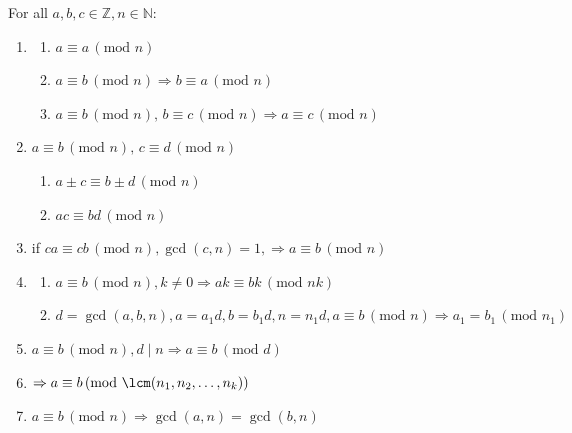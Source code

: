 \documentclass[../lecture-notes.tex]{subfiles}
\begin{document}
\begin{lemma} [Properties.] 
    For all $a, b, c \in \mathbb{Z}, n \in \mathbb{N}: $

    \begin{enumerate}
        \item 
        \begin{enumerate}
            \item $a \equiv a \, (\text{mod } n)$
            \item $a \equiv b \, (\text{mod } n) \Rightarrow b \equiv a \, (\text{mod } n)$
            \item $a \equiv b \, (\text{mod } n), \, b \equiv c \, (\text{mod } n) \Rightarrow a \equiv c \, (\text{mod } n)$
        \end{enumerate}
        \item $ a \equiv b \, (\text{mod } n), \, c \equiv d \, (\text{mod } n)$
        \begin{enumerate}
            \item $ a \pm c \equiv b \pm d \, (\text{mod } n)$
            \item $ ac \equiv bd \, (\text{mod } n)$
        \end{enumerate}
        \item if $ca \equiv cb \, (\text{mod } n), \gcd(c, n) = 1, \Rightarrow a \equiv b \, (\text{mod } n)$
        \item 
        \begin{enumerate}
            \item $a \equiv b \, (\text{mod } n), k \neq 0 \Rightarrow ak \equiv bk \, (\text{mod } nk) $
            \item $d = \gcd(a, b, n), a = a_1d, b =b_1d, n = n_1d, a \equiv b \, (\text{mod } n) \Rightarrow a_1 = b_1 \, (\text{mod } n_1)$
        \end{enumerate}
        \item $ a \equiv b \, (\text{mod } n), d \mid n \Rightarrow a \equiv b \, (\text{mod } d)$
        \item 
        $\Rightarrow a \equiv b \, (\text{mod } \lcm(n_1, n_2, \dots, n_k))$
        \item $a \equiv b \, (\text{mod } n) \Rightarrow \gcd(a, n) = \gcd(b, n)$
    \end{enumerate}
\end{lemma}
\end{document}
